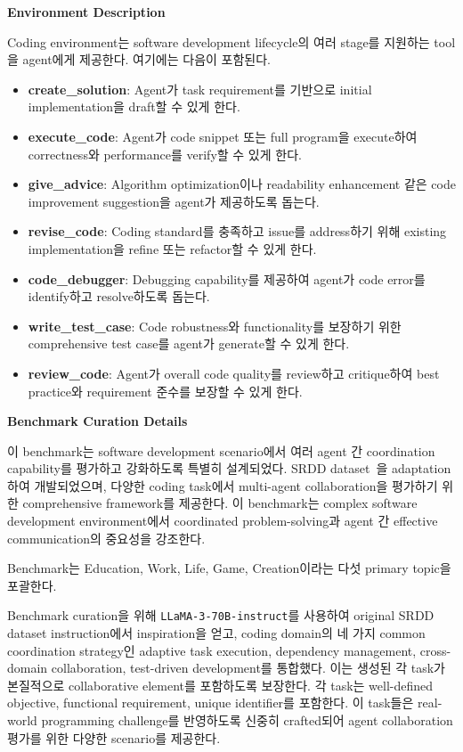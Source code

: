 \textbf{Environment Description}

Coding environment는 software development lifecycle의 여러 stage를 지원하는 tool을 agent에게 제공한다. 여기에는 다음이 포함된다.

\begin{itemize}
    \item \textbf{create\_solution}: Agent가 task requirement를 기반으로 initial implementation을 draft할 수 있게 한다.
    \item \textbf{execute\_code}: Agent가 code snippet 또는 full program을 execute하여 correctness와 performance를 verify할 수 있게 한다.
    \item \textbf{give\_advice}: Algorithm optimization이나 readability enhancement 같은 code improvement suggestion을 agent가 제공하도록 돕는다.
    \item \textbf{revise\_code}: Coding standard를 충족하고 issue를 address하기 위해 existing implementation을 refine 또는 refactor할 수 있게 한다.
    \item \textbf{code\_debugger}: Debugging capability를 제공하여 agent가 code error를 identify하고 resolve하도록 돕는다.
    \item \textbf{write\_test\_case}: Code robustness와 functionality를 보장하기 위한 comprehensive test case를 agent가 generate할 수 있게 한다.
    \item \textbf{review\_code}: Agent가 overall code quality를 review하고 critique하여 best practice와 requirement 준수를 보장할 수 있게 한다.
\end{itemize}

\textbf{Benchmark Curation Details}

이 benchmark는 software development scenario에서 여러 agent 간 coordination capability를 평가하고 강화하도록 특별히 설계되었다. SRDD dataset~\citep{Li2023ChatDev}을 adaptation하여 개발되었으며, 다양한 coding task에서 multi-agent collaboration을 평가하기 위한 comprehensive framework를 제공한다. 이 benchmark는 complex software development environment에서 coordinated problem-solving과 agent 간 effective communication의 중요성을 강조한다.

Benchmark는 Education, Work, Life, Game, Creation이라는 다섯 primary topic을 포괄한다.

Benchmark curation을 위해 \texttt{LLaMA-3-70B-instruct}를 사용하여 original SRDD dataset instruction에서 inspiration을 얻고, coding domain의 네 가지 common coordination strategy인 adaptive task execution, dependency management, cross-domain collaboration, test-driven development를 통합했다. 이는 생성된 각 task가 본질적으로 collaborative element를 포함하도록 보장한다. 각 task는 well-defined objective, functional requirement, unique identifier를 포함한다. 이 task들은 real-world programming challenge를 반영하도록 신중히 crafted되어 agent collaboration 평가를 위한 다양한 scenario를 제공한다.

